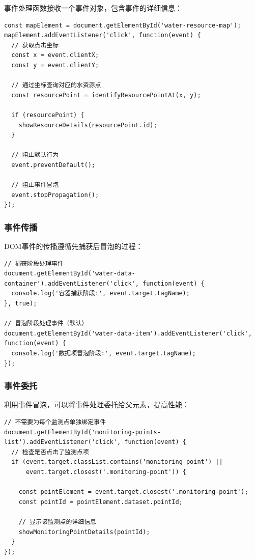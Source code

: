 事件处理函数接收一个事件对象，包含事件的详细信息：

\begin{lstlisting}
const mapElement = document.getElementById('water-resource-map');
mapElement.addEventListener('click', function(event) {
  // 获取点击坐标
  const x = event.clientX;
  const y = event.clientY;
  
  // 通过坐标查询对应的水资源点
  const resourcePoint = identifyResourcePointAt(x, y);
  
  if (resourcePoint) {
    showResourceDetails(resourcePoint.id);
  }
  
  // 阻止默认行为
  event.preventDefault();
  
  // 阻止事件冒泡
  event.stopPropagation();
});
\end{lstlisting}

\subsubsection{事件传播}\label{ux4e8bux4ef6ux4f20ux64ad}

DOM事件的传播遵循先捕获后冒泡的过程：

\begin{lstlisting}
// 捕获阶段处理事件
document.getElementById('water-data-container').addEventListener('click', function(event) {
  console.log('容器捕获阶段:', event.target.tagName);
}, true);

// 冒泡阶段处理事件（默认）
document.getElementById('water-data-item').addEventListener('click', function(event) {
  console.log('数据项冒泡阶段:', event.target.tagName);
});
\end{lstlisting}

\subsubsection{事件委托}\label{ux4e8bux4ef6ux59d4ux6258}

利用事件冒泡，可以将事件处理委托给父元素，提高性能：

\begin{lstlisting}
// 不需要为每个监测点单独绑定事件
document.getElementById('monitoring-points-list').addEventListener('click', function(event) {
  // 检查是否点击了监测点项
  if (event.target.classList.contains('monitoring-point') || 
      event.target.closest('.monitoring-point')) {
    
    const pointElement = event.target.closest('.monitoring-point');
    const pointId = pointElement.dataset.pointId;
    
    // 显示该监测点的详细信息
    showMonitoringPointDetails(pointId);
  }
});
\end{lstlisting}


